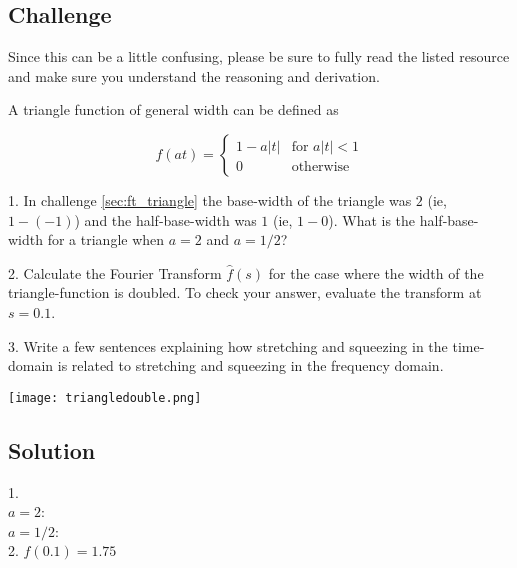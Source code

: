 \subsection*{Challenge}
Since this can be a little confusing, please be sure to fully read the listed resource and make sure you understand the reasoning and derivation.

A triangle function of general width can be defined as

\begin{equation}
    f(at)=
    \begin{cases}
        1 - a|t| & \text{for } a|t| < 1\\
        0 & \text{otherwise}
    \end{cases}
\end{equation}

1. In challenge \ref{sec:ft_triangle} the base-width of the triangle was $2$ (ie, $1-(-1)$) and the half-base-width was $1$ (ie, $1-0$). What is the half-base-width for a triangle when $a=2$ and $a=1/2$?

2. Calculate the Fourier Transform $\hat{f}(s)$ for the case where the width of the triangle-function is doubled. To check your answer, evaluate the transform at $s=0.1$.

3. Write a few sentences explaining how stretching and squeezing in the time-domain is related to stretching and squeezing in the frequency domain.

\texttt{[image: triangledouble.png]}

\subsection*{Solution}
1.\\
$a=2$: \\
$a=1/2$: \\

2. $\hat{f}(0.1)=1.75$

\timebox





